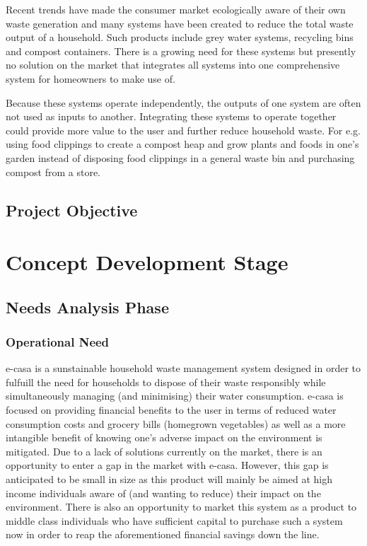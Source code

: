 \documentclass[a4paper,11pt,fleqn]{report}
\begin{document}
Recent trends have made the consumer market ecologically aware of their own waste generation and many systems have been created to reduce the total waste output of a household. Such products include grey water systems, recycling bins and compost containers. There is a growing need for these systems but presently no solution on the market that integrates all systems into one comprehensive system for homeowners to make use of.
  
Because these systems operate independently, the outputs of one system are often not used as inputs to another. Integrating these systems to operate together could provide more value to the user and further reduce household waste. For e.g. using food clippings to create a compost heap and grow plants and foods in one's garden instead of disposing food clippings in a general waste bin and purchasing compost from a store.

\section{Project Objective} \label{sec: Project Objective}

\chapter{Concept Development Stage}
\section{Needs Analysis Phase} \label{sec: Needs Analysis Phase}
\subsection{Operational Need} \label{Ssec: Operational Need}
\ac{e-casa} is a sunstainable household waste management system designed in order to fulfuill the need for households to dispose of their waste responsibly while simultaneously managing (and minimising) their water consumption. \ac{e-casa} is focused on providing financial benefits to the user in terms of reduced water consumption costs and grocery bills (homegrown vegetables) as well as a more intangible benefit of knowing one's adverse impact on the environment is mitigated. Due to a lack of solutions currently on the market, there is an opportunity to enter a gap in the market with \ac{e-casa}. However, this gap is anticipated to be small in size as this product will mainly be aimed at high income individuals aware of (and wanting to reduce) their impact on the environment. There is also an opportunity to market this system as a product to middle class individuals who have sufficient capital to purchase such a system now in order to reap the aforementioned financial savings down the line.\\
\end{document}
